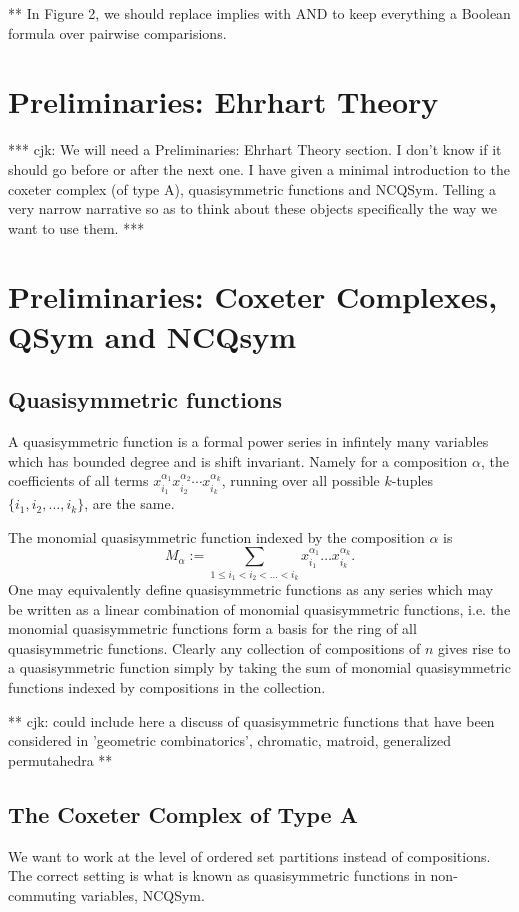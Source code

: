 \documentclass[12pt]{amsart}
\begin{document}
** In Figure 2, we should replace implies with AND to keep everything a Boolean formula over pairwise comparisions. 

\section{Preliminaries: Ehrhart Theory}

*** cjk: We will need a Preliminaries: Ehrhart Theory section.  I don't know if it should go before or after the next one.
I have given a minimal introduction to the coxeter complex (of type A), quasisymmetric functions and NCQSym.  Telling a very narrow narrative so as to think about these objects specifically the way we want to use them. ***



\section{Preliminaries: Coxeter Complexes, QSym and NCQsym}
\label{sec:prelim-qsym}

\subsection{Quasisymmetric functions}
A quasisymmetric function is a formal power series in infintely many
variables which has bounded degree and is shift invariant.  Namely for
a composition $\alpha$, the coefficients of all terms
$x_{i_1}^{\alpha_1}x_{i_2}^{\alpha_2} \cdots x_{i_k}^{\alpha_k}$,
running over all possible $k$-tuples $\{i_1, i_2, \ldots, i_k \}$, are
the same.


The monomial quasisymmetric function indexed by the composition $\alpha$ is 
$$M_{\alpha} := \sum_{1 \leq i_1 < i_2 < \ldots < i_k}
x_{i_1}^{\alpha_1} \ldots x_{i_k}^{\alpha_k}.$$  One may equivalently
define quasisymmetric functions as any series which may be written as a
linear combination of monomial quasisymmetric functions, i.e. the
monomial quasisymmetric functions form a basis for the ring of all
quasisymmetric functions.  Clearly any collection of
compositions of $n$ gives rise to a quasisymmetric function simply by
taking the sum of monomial quasisymmetric functions indexed by
compositions in the collection.

** cjk: could include here a discuss of quasisymmetric functions that have
been considered in 'geometric combinatorics', chromatic, matroid,
generalized permutahedra **

\subsection{The Coxeter Complex of Type A}
We want to work at the level of ordered set partitions instead of
compositions.  The correct setting is what is known as 
quasisymmetric functions in non-commuting variables, NCQSym.
\end{document}
